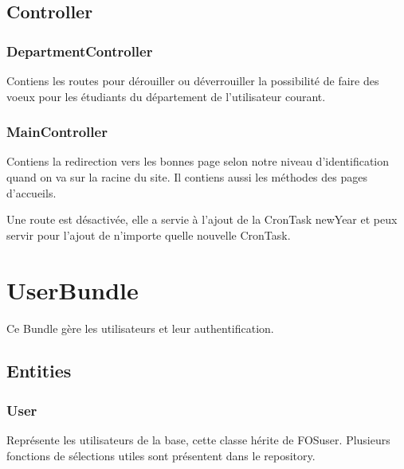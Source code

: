 \subsection{Controller}
\subsubsection{DepartmentController}
Contiens les routes pour dérouiller ou déverrouiller la possibilité de faire des voeux pour les étudiants du département de l'utilisateur courant.

\subsubsection{MainController}
Contiens la redirection vers les bonnes page selon notre niveau d'identification quand on va sur la racine du site.
Il contiens aussi les méthodes des pages d'accueils.

Une route est désactivée, elle a servie à l'ajout de la CronTask newYear et peux servir pour l'ajout de n'importe quelle nouvelle CronTask.


\section{UserBundle}
Ce Bundle gère les utilisateurs et leur authentification.

\subsection{Entities}
\subsubsection{User}
Représente les utilisateurs de la base, cette classe hérite de FOSuser. Plusieurs fonctions de sélections utiles sont présentent dans le repository.